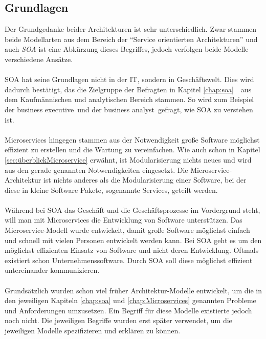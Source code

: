 \subsection{Grundlagen}
\label{subsec:FazitGrundlagen}
Der Grundgedanke beider Architekturen ist sehr unterschiedlich. Zwar stammen beide Modellarten aus dem Bereich der "`Service orientierten Architekturen"' und auch \textit{SOA} ist eine Abkürzung dieses Begriffes, jedoch verfolgen beide Modelle verschiedene Ansätze.  
\\\\
SOA hat seine Grundlagen nicht in der IT, sondern in Geschäftswelt. Dies wird dadurch bestätigt, das die Zielgruppe der Befragten in Kapitel \ref{chap:soa}\ \ aus dem Kaufmännischen und analytischen Bereich stammen. So wird zum Beispiel der \flqq business executive\frqq\ und der \flqq business analyst\frqq\ gefragt, wie SOA zu verstehen ist.
\\\\
Microservices hingegen stammen aus der Notwendigkeit große Software möglichst effizient zu erstellen und die Wartung zu vereinfachen. Wie auch schon in Kapitel \ref{sec:überblickMicroservice}  erwähnt, ist Modularisierung nichts neues und wird aus den gerade genannten Notwendigkeiten eingesetzt. Die Microservice-Architektur ist nichts anderes als die Modularisierung einer Software, bei der diese in kleine Software Pakete, sogenannte Services, geteilt werden.
\\\\
Während bei SOA das Geschäft und die Geschäftsprozesse im Vordergrund steht, will man mit Microservices die Entwicklung von Software unterstützen. Das Microservice-Modell wurde entwickelt, damit große Software möglichst einfach und schnell mit vielen Personen entwickelt werden kann. Bei SOA geht es um den möglichst effizienten Einsatz von Software und nicht deren Entwicklung. Oftmals existiert schon Unternehmenssoftware. Durch SOA soll diese möglichst effizient untereinander kommunizieren.
\\\\
Grundsätzlich wurden schon viel früher Architektur-Modelle entwickelt, um die in den jeweiligen Kapiteln \ref{chap:soa}  und \ref{chap:Microservices}  genannten Probleme und Anforderungen umzusetzen. Ein Begriff für diese Modelle existierte jedoch noch nicht. Die jeweiligen Begriffe wurden erst später verwendet, um die jeweiligen Modelle spezifizieren und erklären zu können.

